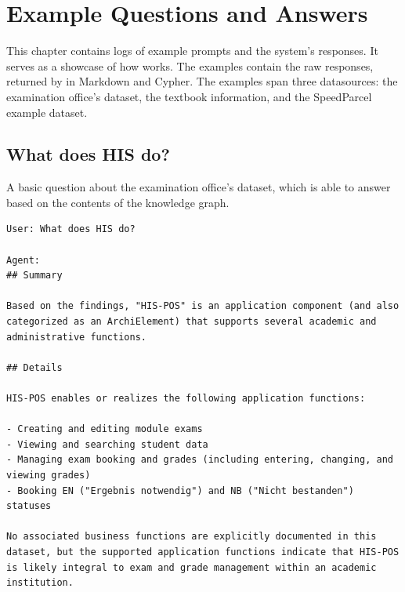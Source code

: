 \chapter{\prototype{} Example Questions and Answers}
\label{appendix:ch:example_questions}

This chapter contains logs of example prompts and the system's responses. It serves as a showcase of how \prototype{} works. The examples contain the raw responses, returned by \prototype{} in Markdown and Cypher. The examples span three datasources: the examination office's dataset, the textbook information, and the SpeedParcel example dataset.

\section{What does HIS do?}
\label{appendix:code:whatDoesHisDo}
A basic question about the examination office's dataset, which \prototype{} is able to answer based on the contents of the knowledge graph.

\begin{lstlisting}[style=cypherstyle, label={lst:qWhatIsHis},caption={Asking \prototype{} what the application HIS is.}]
User: What does HIS do?

Agent:
## Summary

Based on the findings, "HIS-POS" is an application component (and also categorized as an ArchiElement) that supports several academic and administrative functions.

## Details

HIS-POS enables or realizes the following application functions:

- Creating and editing module exams
- Viewing and searching student data
- Managing exam booking and grades (including entering, changing, and viewing grades)
- Booking EN ("Ergebnis notwendig") and NB ("Nicht bestanden") statuses

No associated business functions are explicitly documented in this dataset, but the supported application functions indicate that HIS-POS is likely integral to exam and grade management within an academic institution.

\end{lstlisting}

